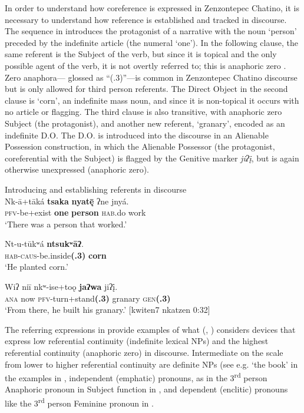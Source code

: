 \documentclass[output=paper]{../langscibook}
\begin{document}
In order to understand how coreference is expressed in Zenzontepec Chatino, it is necessary to understand how reference is established and tracked in discourse. The sequence in  introduces the protagonist of a narrative with the noun ‘person’ preceded by the indefinite article (the numeral ‘one’). In the following clause, the same referent is the Subject of the verb, but since it is topical and the only possible agent of the verb, it is not overtly referred to; this is anaphoric zero \citep{Givon1983}. Zero anaphora— glossed as “(.3)”—is common in Zenzontepec Chatino discourse but is only allowed for third person referents. The Direct Object in the second clause is ‘corn’, an indefinite mass noun, and since it is non-topical it occurs with no article or flagging. The third clause is also transitive, with anaphoric zero Subject (the protagonist), and another new referent, ‘granary’, encoded as an indefinite D.O. The D.O. is introduced into the discourse in an Alienable Possession construction, in which the Alienable Possessor (the protagonist, coreferential with the Subject) is flagged by the Genitive marker \textit{jiʔį̄}, but is again otherwise unexpressed (anaphoric zero).


\ea\label{ex:campbell:19}
{Introducing and establishing referents in discourse}\\
\ea
\label{ex:campbell:19a}
\gll Nk-ā+tāká  \textbf{tsaka}  \textbf{nyat\={ę}}  ʔne  jnyá.\\
     \textsc{pfv}{}-be+exist  \textbf{one}  \textbf{person}  \textsc{hab}.do  work\\
\glt ‘There was a person that worked.’


\ex\label{ex:campbell:19b}
\gll Nt-u-tūkʷá  \textbf{ntsukʷāʔ}.\\
     \textsc{hab}{}-\textsc{caus}{}-be.inside\textbf{(.3)}  \textbf{corn}\\
\glt ‘He planted corn.’


\ex\label{ex:campbell:19c}
\gll Wiʔ  niī  nkʷ-ise+toǫ  \textbf{jaʔwa}  jiʔį̄.\\
     \textsc{ana}  now  \textsc{pfv}{}-turn+stand\textbf{(.3)}  granary  \textsc{gen}\textbf{(.3)}\\
\glt ‘From there, he built his granary.’ [kwiten7 nkatzen 0:32]
\z
\z


The referring expressions in  provide examples of what (\citealt{Givon1983}, \citealt[6]{Givon2017}) considers devices that express low referential continuity (indefinite lexical NPs) and the highest referential continuity (anaphoric zero) in discourse. Intermediate on the scale from lower to higher referential continuity are definite NPs (see e.g. ‘the book’ in the examples in , independent (emphatic) pronouns, as in the 3\textsuperscript{rd} person Anaphoric pronoun in Subject function in , and dependent (enclitic) pronouns like the 3\textsuperscript{rd} person Feminine pronoun in .
\end{document}
